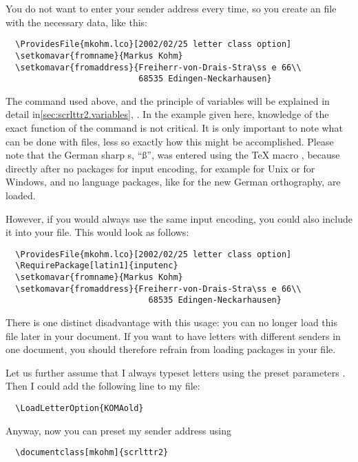 \begin{Example}
  You do not want to enter your sender address every time, so you
  create an  file with the necessary data, like this:
\begin{lstlisting}
  \ProvidesFile{mkohm.lco}[2002/02/25 letter class option]
  \setkomavar{fromname}{Markus Kohm}
  \setkomavar{fromaddress}{Freiherr-von-Drais-Stra\ss e 66\\
                           68535 Edingen-Neckarhausen}
\end{lstlisting}
The command  used above, and the principle of
variables will be explained in detail
in\autoref{sec:scrlttr2.variables},
. In the example given
here, knowledge of the exact function of the command is not
critical. It is only important to note what can be done with
 files, less so exactly how this might be
accomplished. Please note that the German sharp s, ``\ss'', was
entered using the {\TeX} macro , because directly after
 no packages for input encoding, for example
\PValue{[latin1]} for Unix or
\PValue{[ansinew]} for Windows,
and no language packages, like
 for the
new German orthography, are loaded.
  
However, if you would always use the same input encoding, you could
also include it into your  file. This would look as follows:
\begin{lstlisting}
  \ProvidesFile{mkohm.lco}[2002/02/25 letter class option]
  \RequirePackage[latin1]{inputenc}
  \setkomavar{fromname}{Markus Kohm}
  \setkomavar{fromaddress}{Freiherr-von-Drais-Stra\ss e 66\\
                             68535 Edingen-Neckarhausen}
\end{lstlisting}
There is one distinct disadvantage with this usage: you can no longer
load this  file later in your document. If you want to have
letters with different senders in one document, you should therefore
refrain from loading packages in your  file.
  
Let us further assume that I always typeset letters using the preset
parameters . Then I could add the following line to my
 file:
\begin{lstlisting}
  \LoadLetterOption{KOMAold}
\end{lstlisting}
  
  Anyway, now you can preset my sender address using
\begin{lstlisting}
  \documentclass[mkohm]{scrlttr2}
\end{lstlisting}
\end{Example}

